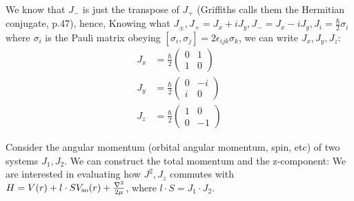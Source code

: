 \documentclass{school-22.101-notes}
\begin{document}
We know that $J_-$ is just the transpose of $J_+$ (Griffiths calls them the Hermitian conjugate, p.47), hence, 
Knowing what $J_{\pm}, J_+ = J_x + i J_y, J_- = J_x - iJ_y, J_i = \frac{\hbar}{2} \sigma_i$ where $\sigma_i$ is the Pauli matrix obeying $[ \sigma_i, \sigma_j] = 2 \epsilon_{ijk} \sigma_k$, we can write $J_x, J_y, J_z$: 
\begin{align}
  J_x &= \frac{\hbar}{2} \left( \begin{array}{cc} 0 & 1 \\ 1 & 0 \end{array} \right) \\
  J_y &= \frac{\hbar}{2} \left( \begin{array}{cc} 0 & -i \\ i & 0 \end{array} \right) \\
  J_z &= \frac{\hbar}{2} \left( \begin{array}{cc} 1 & 0 \\ 0 & -1 \end{array} \right) 
\end{align}






Consider the angular momentum (orbital angular momentum, spin, etc) of two systems $J_1, J_2$. We can construct the total momentum and the z-component: 
We are interested in evaluating how $J^2, J_z$ commutes with $H = V(r) + l \cdot S V_{\mathrm{so}} (r) + \frac{\nabla^2}{2 \mu}$, where $l \cdot S = J_1 \cdot J_2$. 
\end{document}
